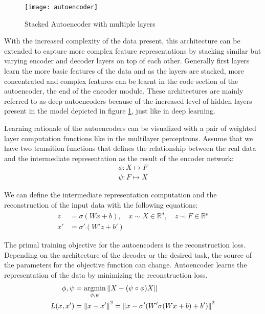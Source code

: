 \begin{figure}[h!]
	\centering
	\texttt{[image: autoencoder]}
    \caption{Stacked Autoencoder with multiple layers}
    \label{fig:ae_deep}
\end{figure}

With the increased complexity of the data present, this architecture can be extended to capture more
complex feature representations by stacking similar but varying encoder and decoder layers on top of
each other. Generally first layers learn the more basic features of the data and as the layers are
stacked, more concentrated and complex features can be learnt in the code section of the
autoencoder, the end of the encoder module. These architectures are mainly referred to as deep
autoencoders because of the increased level of hidden layers present in the model depicted in figure
\ref{fig:ae_deep}, just like in deep learning.

Learning rationale of the autoencoders can be visualized with a pair of weighted layer computation
functions like in the multilayer perceptrons. Assume that we have two transition functions that
defines the relationship between the real data and the intermediate representation as the result of
the encoder network:
\begin{align*}
    \phi : X \mapsto F \\
    \psi : F \mapsto X     
\end{align*}

We can define the intermediate representation computation and the reconstruction of the input data
with the following equations:
\begin{align}  
    z  &= \sigma( W x + b) ,\quad x \sim X \in \mathbb{R}^d ,\quad z \sim F \in \mathbb{R}^p \\
    x'  &= \sigma' (W' z + b') 
\end{align}

The primal training objective for the autoencoders is the reconstruction loss. Depending on the
architecture of the decoder or the desired task, the source of the parameters for the objective
function can change. Autoencoder learns the representation of the data by minimizing the
reconstruction loss. 
\begin{align}
    \label{eqn:ae_rec}
  \phi, \psi & = \underset{\phi, \psi}{\text{argmin}} \left\lVert X - (\psi \circ \phi) X\right\rVert \\  
  L(x, x') & = \left\lVert x - x'\right\rVert^2 = \left\lVert x - \sigma' (W' \sigma (W x + b) + b')\right\rVert^2
\end{align}

